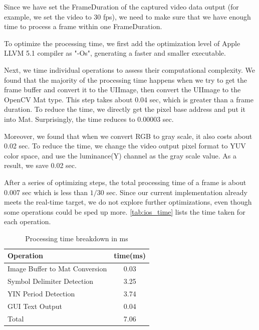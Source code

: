 Since we have set the FrameDuration of the captured video data output (for example, we set the video to 30 fps), we need to make sure that we have enough time to process a frame within one FrameDuration.

To optimize the processing time, we first add the optimization level of Apple LLVM 5.1 compiler as "-Os", generating a faster and smaller executable.

Next, we time individual operations to assess their computational complexity. We found that the majority of the processing time happens when we try to get the frame buffer and convert it to the UIImage, then convert the UIImage to the OpenCV Mat type. This step takes about 0.04 sec, which is greater than a frame duration. To reduce the time, we directly get the pixel base address and put it into Mat. Surprisingly, the time reduces to 0.00003 sec.

Moreover, we found that when we convert RGB to gray scale, it also costs about 0.02 sec. To reduce the time, we change the video output pixel format to YUV color space, and use the luminance(Y) channel as the gray scale value. As a result, we save 0.02 sec.

After a series of optimizing steps, the total processing time of a frame is about 0.007 sec which is less than $1/30$ sec. Since our current implementation already meets the real-time target, we do not explore further optimizations, even though some operations could be sped up more.
 \autoref{tab:ios_time} lists the time taken for each operation.

\begin{table}[!t]
\centering
\caption{Processing time breakdown in ms}
        \begin{tabular}{lc}
        \hline Operation & time(ms) \\ \hline \hline
        Image Buffer to Mat Conversion & 0.03 \\
        Symbol Delimiter Detection & 3.25 \\
        YIN Period Detection & 3.74 \\
        GUI Text Output & 0.04 \\
        \hline
        Total & 7.06 \\
        \hline
        \end{tabular}
        \label{tab:ios_time}
\end{table}